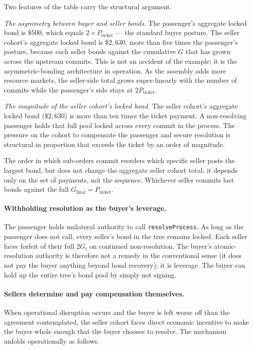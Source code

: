 \documentclass[11pt,a4paper]{article}
\theoremstyle{definition}
\theoremstyle{remark}
\begin{document}
Two features of the table carry the structural argument.

\emph{The asymmetry between buyer and seller bonds.} The
passenger's aggregate locked bond is $\$500$, which equals
$2 \times P_{\text{ticket}}$ --- the standard buyer posture. The
seller cohort's aggregate locked bond is $\$2{,}630$, more than
five times the passenger's posture, because each seller bonds
against the cumulative $G$ that has grown across the upstream
commits. This is not an accident of the example; it is the
asymmetric-bonding architecture in operation. As the assembly
adds more resource markets, the seller-side total grows
super-linearly with the number of commits while the passenger's
side stays at $2 P_{\text{ticket}}$.

\emph{The magnitude of the seller cohort's locked bond.} The
seller cohort's aggregate locked bond ($\$2{,}630$) is more than
ten times the ticket payment. A non-resolving passenger holds
that full pool locked across every commit in the process. The
pressure on the cohort to compensate the passenger and secure
resolution is structural in proportion that exceeds the ticket by
an order of magnitude.

The order in which sub-orders commit reorders which specific
seller posts the largest bond, but does not change the aggregate
seller cohort total: it depends only on the set of payments, not
the sequence. Whichever seller commits last bonds against the
full $G_{\text{final}} = P_{\text{ticket}}$.

\paragraph{Withholding resolution as the buyer's leverage.}
The passenger holds unilateral authority to call
\texttt{resolveProcess}. As long as the passenger does not call,
every seller's bond in the tree remains locked. Each seller faces
forfeit of their full $2G_i$ on continued non-resolution. The
buyer's atomic-resolution authority is therefore not a remedy in
the conventional sense (it does not pay the buyer anything beyond
bond recovery); it is leverage. The buyer can hold up the entire
tree's bond pool by simply not signing.

\paragraph{Sellers determine and pay compensation themselves.}
When operational disruption occurs and the buyer is left worse
off than the agreement contemplated, the seller cohort faces
direct economic incentive to make the buyer whole enough that the
buyer chooses to resolve. The mechanism unfolds operationally as
follows.
\end{document}
